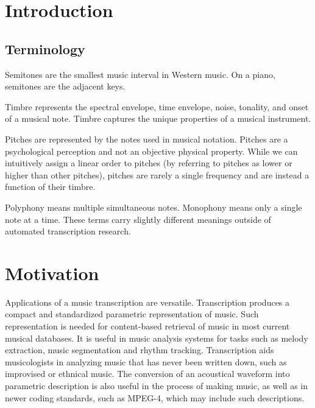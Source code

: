 \documentclass[5p]{elsarticle}
\begin{document}
\setcounter{topnumber}{1}

\section{Introduction}


\subsection{Terminology}
Semitones are the smallest music interval in Western music. On a piano, semitones are the adjacent keys.

Timbre represents the spectral envelope, time envelope, noise, tonality, and onset of a musical note. Timbre captures the unique properties of a musical instrument.

Pitches are represented by the notes used in musical notation. Pitches are a psychological perception and not an objective physical property. While we can intuitively assign a linear order to pitches (by referring to pitches as lower or higher than other pitches), pitches are rarely a single frequency and are instead a function of their timbre. 

Polyphony means multiple simultaneous notes. Monophony means only a single note at a time. These terms carry slightly different meanings outside of automated transcription research.

\section{Motivation}



Applications of a music transcription are versatile. Transcription produces a compact and standardized parametric representation of music. Such representation is needed for content-based retrieval of music in most current musical databases. It is useful in music analysis systems for tasks such as melody extraction, music segmentation and rhythm tracking. Transcription aids musicologists in analyzing music that has never been written down, such as improvised or ethnical music. The conversion of an acoustical waveform into parametric description is also useful in the process of making music, as well as in newer coding standards, such as MPEG-4, which may include such descriptions. 
\end{document}
